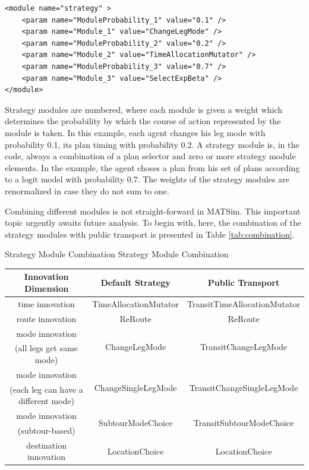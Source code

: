 \begin{lstlisting}
<module name="strategy" >
    <param name="ModuleProbability_1" value="0.1" />
    <param name="Module_1" value="ChangeLegMode" />
    <param name="ModuleProbability_2" value="0.2" />
    <param name="Module_2" value="TimeAllocationMutator" />
    <param name="ModuleProbability_3" value="0.7" />
    <param name="Module_3" value="SelectExpBeta" />
</module>
\end{lstlisting}

Strategy modules are numbered, where each module is given a weight which determines the probability by which the course of action represented by the module is taken. In this example, each agent changes his leg mode with probability 0.1, its plan timing with probability 0.2. A strategy module is, in the code, always a combination of a plan selector and zero or more strategy module elements. In the example, the agent choses a plan from his set of plans according to a logit model with probability 0.7. The weights of the strategy modules are renormalized in case they do not sum to one.

Combining different modules is not straight-forward in MATSim. This important topic urgently awaits future analysis. To begin with, here, the combination of the strategy modules with public transport is presented in Table \ref{tab:combination}.

\createtable%
{Strategy Module Combination}%
{Strategy Module Combination}%
{\label{tab:combination}}%
{%
  \begin{tabular}[c]{|c|c|c|}
   \hline
\textbf{Innovation Dimension}	& \textbf{Default Strategy} & \textbf{Public Transport}\\
\hline
time innovation & TimeAllocationMutator &  TransitTimeAllocationMutator\\
\hline
route innovation & ReRoute & ReRoute \\
\hline
mode innovation & \multirow{2}{*}{ChangeLegMode} & \multirow{2}{*}{TransitChangeLegMode} \\
(all legs get same mode) &  &  \\
\hline
mode innovation & \multirow{2}{*}{ChangeSingleLegMode} & \multirow{2}{*}{TransitChangeSingleLegMode} \\
(each leg can have a different mode) &  &  \\
\hline
mode innovation & \multirow{2}{*}{SubtourModeChoice} & \multirow{2}{*}{TransitSubtourModeChoice} \\
(subtour-based) &  &  \\
\hline
destination innovation & LocationChoice & LocationChoice \\
\hline
  \end{tabular}
}%
{}

